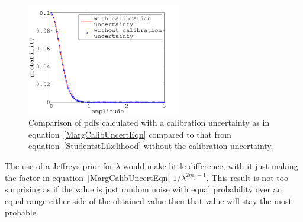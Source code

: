\begin{figure}[!htbp]
\begin{center}
\includegraphics[width=0.6\textwidth]{figs/MargCalibUncert}\caption[Marginalised
calibration uncertainty.]{Comparison of pdfs calculated with a calibration uncertainty as in
equation~\ref{MargCalibUncertEqn} compared to that from equation~\ref{StudentstLikelihood} without
the calibration uncertainty.}\label{MargCalibUncert}
\end{center}
\end{figure}
The use of a Jeffreys prior for $\lambda$ would make little difference, with it just making the
factor in equation~\ref{MargCalibUncertEqn} $1/\lambda^{2m_j-1}$. This result is not too
surprising as if the value is just random noise with equal probability over an equal range either
side of the obtained value then that value will stay the most probable.

